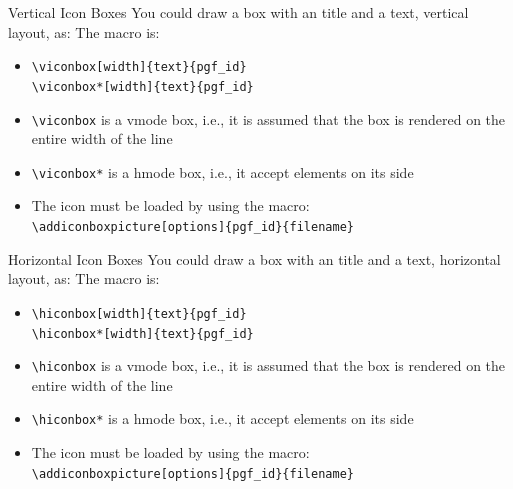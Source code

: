 \documentclass[english,sectioncirclenumberstyle]{ciadbeamer}
\begin{document}
\begin{frame}{Vertical Icon Boxes}
	You could draw a box with an title and a text, vertical layout, as:
	The macro is:	
	\begin{itemize}
	\item \texttt{{\textbackslash}viconbox[width]\{text\}\{pgf\_id\}} \\
		\texttt{{\textbackslash}viconbox*[width]\{text\}\{pgf\_id\}} \\[.5cm]
	\item \texttt{{\textbackslash}viconbox} is a vmode box, i.e., it is assumed that the box is rendered on the entire width of the line
	\item \texttt{{\textbackslash}viconbox*} is a hmode box, i.e., it accept elements on its side
	\item \alert{The icon must be loaded by using the macro:} \\
		\texttt{{\textbackslash}addiconboxpicture[options]\{pgf\_id\}\{filename\}}
	\end{itemize}
\end{frame}

\begin{frame}{Horizontal Icon Boxes}
	You could draw a box with an title and a text, horizontal layout, as:
	The macro is:	
	\begin{itemize}
	\item \texttt{{\textbackslash}hiconbox[width]\{text\}\{pgf\_id\}} \\
		\texttt{{\textbackslash}hiconbox*[width]\{text\}\{pgf\_id\}} \\[.5cm]
	\item \texttt{{\textbackslash}hiconbox} is a vmode box, i.e., it is assumed that the box is rendered on the entire width of the line
	\item \texttt{{\textbackslash}hiconbox*} is a hmode box, i.e., it accept elements on its side
	\item \alert{The icon must be loaded by using the macro:} \\
		\texttt{{\textbackslash}addiconboxpicture[options]\{pgf\_id\}\{filename\}}
	\end{itemize}
\end{frame}
\end{document}
